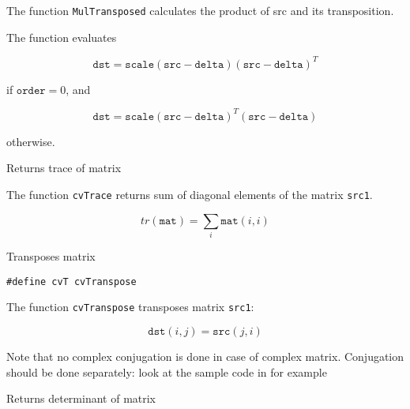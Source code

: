 The function \texttt{MulTransposed} calculates the product of src and its transposition.

The function evaluates

\[
\texttt{dst}=\texttt{scale} (\texttt{src}-\texttt{delta}) (\texttt{src}-\texttt{delta})^T
\]

if $\texttt{order}=0$, and

\[
\texttt{dst}=\texttt{scale} (\texttt{src}-\texttt{delta})^T (\texttt{src}-\texttt{delta})
\]

otherwise.


Returns trace of matrix


\begin{description}
\end{description}


The function \texttt{cvTrace} returns sum of diagonal elements of the matrix \texttt{src1}.

\[ tr(\texttt{mat}) = \sum_i \texttt{mat}(i,i) \]


Transposes matrix


\begin{lstlisting}
#define cvT cvTranspose
\end{lstlisting}

\begin{description}
\end{description}

The function \texttt{cvTranspose} transposes matrix \texttt{src1}:

\[ \texttt{dst}(i,j) = \texttt{src}(j,i) \]

Note that no complex conjugation is done in case of complex
matrix. Conjugation should be done separately: look at the sample code
in  for example


Returns determinant of matrix


